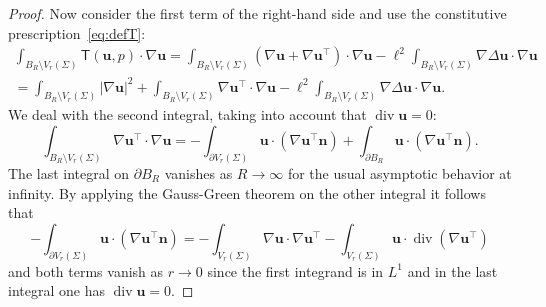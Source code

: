 \documentclass[final]{amsart}
\theoremstyle{definition}
\theoremstyle{definition}
\theoremstyle{remark}
\begin{document}
\begin{proof}
Now consider the first term of the right-hand side and use the
constitutive prescription~\eqref{eq:defT}:
\begin{multline}\label{p}
\int_{B_R\setminus V_r({\Sigma})}{\mathsf T}({\boldsymbol u},p)\cdot\nabla{\boldsymbol u}
=\int_{B_R\setminus V_r({\Sigma})}(\nabla{\boldsymbol u}+\nabla{\boldsymbol u}^{\intercal})\cdot\nabla{\boldsymbol u}
-\ell^2 \int_{B_R\setminus V_r({\Sigma})}\nabla{\Delta}{\boldsymbol u}\cdot \nabla{\boldsymbol u}\\ 
=\int_{B_R\setminus V_r({\Sigma})}|\nabla{\boldsymbol u}|^2
+\int_{B_R\setminus V_r({\Sigma})}\nabla{\boldsymbol u}^{\intercal}\cdot\nabla{\boldsymbol u}
-\ell^2 \int_{B_R\setminus V_r({\Sigma})}\nabla{\Delta}{\boldsymbol u}\cdot \nabla{\boldsymbol u}.
\end{multline}
We deal with the second integral, taking into account that ${\operatorname{\mathrm{div}}}{\boldsymbol u}=0$:
\[
\int_{B_R\setminus V_r({\Sigma})}\nabla{\boldsymbol u}^{\intercal}\cdot\nabla{\boldsymbol u}
= -\int_{{\partial} {V_r({\Sigma})}}{\boldsymbol u}\cdot(\nabla{\boldsymbol u}^{\intercal} {\boldsymbol n})
+\int_{{\partial} B_R}{\boldsymbol u}\cdot(\nabla{\boldsymbol u}^{\intercal} {\boldsymbol n}).
\]
The last integral on ${\partial} B_R$ vanishes as $R\to\infty$ for the usual
asymptotic behavior at infinity. By applying the Gauss-Green theorem
on the other integral it follows that
\[
- \int_{{\partial} {V_r({\Sigma})}}{\boldsymbol u}\cdot(\nabla{\boldsymbol u}^{\intercal} {\boldsymbol n})
=- \int_{V_r({\Sigma})}\nabla{\boldsymbol u}\cdot\nabla{\boldsymbol u}^{\intercal} -
 \int_{V_r({\Sigma})}{\boldsymbol u}\cdot{\operatorname{\mathrm{div}}}(\nabla{\boldsymbol u}^{\intercal})
\]
and both terms vanish as $r\to 0$ since the first integrand is in
$L^1$ and in the last integral one has ${\operatorname{\mathrm{div}}}{\boldsymbol u}=0$.


\end{proof}
\end{document}
